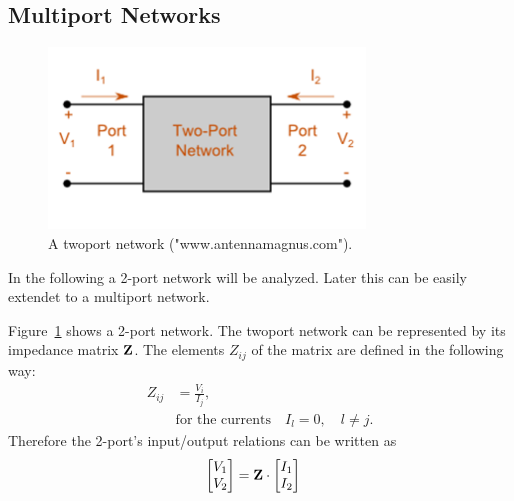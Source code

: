 \subsection{Multiport Networks}
\label{sec:multiport_networks}

\begin{figure}[h]
\begin{center}
\includegraphics[width=0.75\textwidth]{images/twoport.png}
\caption{A twoport network ("www.antennamagnus.com").}
\label{fig:twoport}
\end{center}
\end{figure}
In the following a 2-port network will be analyzed.
Later this can be easily extendet to a multiport network.

Figure~\ref{fig:twoport} shows a 2-port network.
The twoport network can be represented by its impedance matrix $\mathbf{Z}$.
The elements $Z_{ij}$ of the matrix are defined in the following way:
\begin{align}
\label{eq:multiport_impedance}
Z_{ij} &= \frac{V_i}{I_j},\\\nonumber
&\text{for the currents}\quad I_l = 0,\quad l\neq j.
\end{align}
Therefore the 2-port's input/output relations can be written as
\begin{align}
\label{eq:twoport_io}
\begin{bmatrix}
V_1\\V_2
\end{bmatrix} &= \mathbf{Z} \cdot
\begin{bmatrix}
I_1\\I_2
\end{bmatrix}
\end{align}

